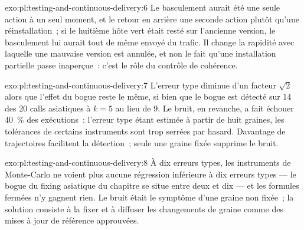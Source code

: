 \begin{solution}{exo:pl:testing-and-continuous-delivery:6}
Le basculement aurait été une seule action à un seul moment, et le retour en arrière une seconde action plutôt qu'une réinstallation~; si le huitième hôte vert
était resté sur l'ancienne version, le basculement lui aurait tout de même envoyé du trafic. Il change la rapidité avec laquelle une mauvaise version est annulée, et non le fait
qu'une installation partielle passe inaperçue~: c'est le rôle du contrôle de cohérence.
\end{solution}

\begin{solution}{exo:pl:testing-and-continuous-delivery:7}
L'erreur type diminue d'un facteur $\sqrt2$ alors que l'effet du bogue reste le même, si bien que le bogue est détecté sur 14 des 20 calls asiatiques à $k=5$ au lieu de 9.
Le bruit, en revanche, a fait échouer 40~\% des exécutions~: l'erreur type étant estimée à partir de huit graines, les tolérances de certains instruments sont trop serrées par
hasard. Davantage de trajectoires facilitent la détection~; seule une graine fixée supprime le bruit.
\end{solution}

\begin{solution}{exo:pl:testing-and-continuous-delivery:8}
À dix erreurs types, les instruments de Monte-Carlo ne voient plus aucune régression inférieure à dix erreurs types --- le bogue du fixing asiatique du chapitre
se situe entre deux et dix --- et les formules fermées n'y gagnent rien. Le bruit était le symptôme d'une graine non fixée~; la solution consiste à la fixer et à diffuser les changements de graine
comme des mises à jour de référence approuvées.
\end{solution}

